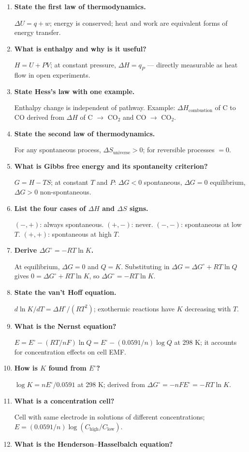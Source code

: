 \documentclass[12pt,a4paper]{article}
\newcommand{\Q}[1]{\textbf{#1}\par\noindent\ignorespaces}
\begin{document}
\begin{tcolorbox}[exambox, title={Frequently Asked / Viva Questions}]
\begin{enumerate}[topsep=0pt, label=\textbf{Q\arabic*.}, itemsep=5pt]
  \item \Q{State the first law of thermodynamics.}
    $\Delta U = q + w$; energy is conserved; heat and work are equivalent forms of energy transfer.
  \item \Q{What is enthalpy and why is it useful?}
    $H = U + PV$; at constant pressure, $\Delta H = q_P$ — directly measurable as heat flow in open experiments.
  \item \Q{State Hess's law with one example.}
    Enthalpy change is independent of pathway. Example: $\Delta H_{\mathrm{combustion}}$ of C to CO derived from $\Delta H$ of C $\to$ CO$_2$ and CO $\to$ CO$_2$.
  \item \Q{State the second law of thermodynamics.}
    For any spontaneous process, $\Delta S_{\mathrm{universe}} > 0$; for reversible processes $= 0$.
  \item \Q{What is Gibbs free energy and its spontaneity criterion?}
    $G = H - TS$; at constant $T$ and $P$: $\Delta G < 0$ spontaneous, $\Delta G = 0$ equilibrium, $\Delta G > 0$ non-spontaneous.
  \item \Q{List the four cases of $\Delta H$ and $\Delta S$ signs.}
    $(-,+)$: always spontaneous. $(+,-)$: never. $(-,-)$: spontaneous at low $T$. $(+,+)$: spontaneous at high $T$.
  \item \Q{Derive $\Delta G^\circ = -RT\ln K$.}
    At equilibrium, $\Delta G = 0$ and $Q = K$. Substituting in $\Delta G = \Delta G^\circ + RT\ln Q$ gives $0 = \Delta G^\circ + RT\ln K$, so $\Delta G^\circ = -RT\ln K$.
  \item \Q{State the van't Hoff equation.}
    $d\ln K/dT = \Delta H^\circ/(RT^2)$; exothermic reactions have $K$ decreasing with $T$.
  \item \Q{What is the Nernst equation?}
    $E = E^\circ - (RT/nF)\ln Q = E^\circ - (0.0591/n)\log Q$ at 298 K; it accounts for concentration effects on cell EMF.
  \item \Q{How is $K$ found from $E^\circ$?}
    $\log K = nE^\circ/0.0591$ at 298 K; derived from $\Delta G^\circ = -nFE^\circ = -RT\ln K$.
  \item \Q{What is a concentration cell?}
    Cell with same electrode in solutions of different concentrations; $E = (0.0591/n)\log(C_{\mathrm{high}}/C_{\mathrm{low}})$.
  \item \Q{What is the Henderson--Hasselbalch equation?}

\end{enumerate}
\end{tcolorbox}
\end{document}
